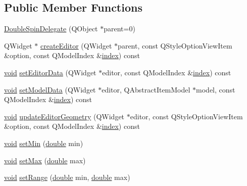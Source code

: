 \subsection*{Public Member Functions}
\begin{DoxyCompactItemize}
\item 
\hyperlink{group___config_plugin_ga53d62f046bdee3e5b67f2b82aaa08a8a}{Double\-Spin\-Delegate} (Q\-Object $\ast$parent=0)
\item 
Q\-Widget $\ast$ \hyperlink{group___config_plugin_ga33340622f34643415ef4fc706e9a6350}{create\-Editor} (Q\-Widget $\ast$parent, const Q\-Style\-Option\-View\-Item \&option, const Q\-Model\-Index \&\hyperlink{glext_8h_ab47dd9958bcadea08866b42bf358e95e}{index}) const 
\item 
\hyperlink{group___u_a_v_objects_plugin_ga444cf2ff3f0ecbe028adce838d373f5c}{void} \hyperlink{group___config_plugin_ga7016b6a15b52b4f03fe882a1ceac795a}{set\-Editor\-Data} (Q\-Widget $\ast$editor, const Q\-Model\-Index \&\hyperlink{glext_8h_ab47dd9958bcadea08866b42bf358e95e}{index}) const 
\item 
\hyperlink{group___u_a_v_objects_plugin_ga444cf2ff3f0ecbe028adce838d373f5c}{void} \hyperlink{group___config_plugin_ga2443d25896b59ae577cfe74ccb2e96c9}{set\-Model\-Data} (Q\-Widget $\ast$editor, Q\-Abstract\-Item\-Model $\ast$model, const Q\-Model\-Index \&\hyperlink{glext_8h_ab47dd9958bcadea08866b42bf358e95e}{index}) const 
\item 
\hyperlink{group___u_a_v_objects_plugin_ga444cf2ff3f0ecbe028adce838d373f5c}{void} \hyperlink{group___config_plugin_gaa8fa5b648a223ce46e7ede0d8d2374c1}{update\-Editor\-Geometry} (Q\-Widget $\ast$editor, const Q\-Style\-Option\-View\-Item \&option, const Q\-Model\-Index \&\hyperlink{glext_8h_ab47dd9958bcadea08866b42bf358e95e}{index}) const 
\item 
\hyperlink{group___u_a_v_objects_plugin_ga444cf2ff3f0ecbe028adce838d373f5c}{void} \hyperlink{group___config_plugin_ga8fe1a2276b7d458c30d82f206d31eef8}{set\-Min} (\hyperlink{_super_l_u_support_8h_a8956b2b9f49bf918deed98379d159ca7}{double} min)
\item 
\hyperlink{group___u_a_v_objects_plugin_ga444cf2ff3f0ecbe028adce838d373f5c}{void} \hyperlink{group___config_plugin_ga0212bd7a414f18e297eef0ab1cbf04ad}{set\-Max} (\hyperlink{_super_l_u_support_8h_a8956b2b9f49bf918deed98379d159ca7}{double} max)
\item 
\hyperlink{group___u_a_v_objects_plugin_ga444cf2ff3f0ecbe028adce838d373f5c}{void} \hyperlink{group___config_plugin_ga630d5ced68d6c22fa36f9a37cd704d01}{set\-Range} (\hyperlink{_super_l_u_support_8h_a8956b2b9f49bf918deed98379d159ca7}{double} min, \hyperlink{_super_l_u_support_8h_a8956b2b9f49bf918deed98379d159ca7}{double} max)

\end{DoxyCompactItemize}
